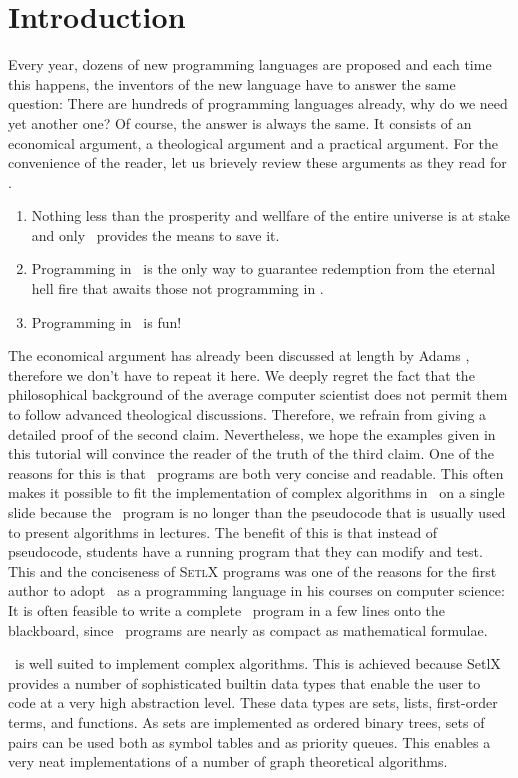 \chapter{Introduction}
Every year, dozens of new programming languages are proposed and each time this
happens,  the inventors of the new language have to answer the same question: 
There are hundreds of programming languages already, why do we need yet another one?  
Of course, the answer is always the same.  It consists of an economical argument, a
theological argument and a practical argument. For the
convenience of the reader, let us brievely review these arguments as they read for \setlx.  
\begin{enumerate}
\item Nothing less than the prosperity and wellfare of the entire universe is at
      stake and only \setlx\ provides the means to save it.
\item Programming in \setlx\ is the only way to guarantee redemption from 
      the eternal hell fire that awaits those not programming in \setlx.
\item Programming in \setlx\ is fun!
\end{enumerate}
The economical argument has already been discussed at length by Adams \cite{adams:1980},
therefore we don't have to repeat it here.   We deeply
regret the fact that the philosophical background of the average computer scientist does not permit
them to follow advanced theological discussions.  Therefore, we refrain from giving a
detailed proof of the second claim.  Nevertheless, we hope the examples given in this
tutorial will convince the reader of the truth of the third claim.
  One of the reasons for this is that \setlx\ programs are both very concise and
readable.  This often makes it possible to fit the implementation of complex algorithms in \setlx\ on a
single slide because the \setlx\ program is no longer than the pseudocode that is usually used to
present algorithms in lectures.  The benefit of this is that instead of pseudocode, students have a
running program that they can modify and test. This and the
conciseness of \textsc{SetlX} programs was one of the reasons for
the first author to adopt \setlx\ as a programming language in his courses on computer
science: It is often feasible to write a complete \setlx\ program in a few lines 
onto the blackboard, since \setlx\ programs are nearly as compact as mathematical formulae.


\setlx\ is well suited to implement complex algorithms. This is achieved because SetlX
provides a number of sophisticated builtin data types that enable the user to code at a very high
abstraction level.
These data types are sets, lists, first-order terms, and functions.  
As sets are implemented as ordered binary trees, sets of pairs can be used both as symbol
tables and as priority queues.  This enables a very neat implementations 
of a number of graph theoretical algorithms.

